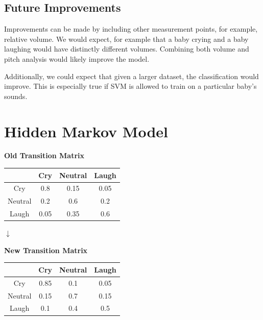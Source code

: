 \documentclass[paper=a4, fontsize=11pt]{scrartcl}
\numberwithin{equation}{section}
\numberwithin{figure}{section}
\numberwithin{table}{section}
\begin{document}
\subsection{Future Improvements}
Improvements can be made by including other measurement points, for example, relative volume. We would expect, for example that a baby crying and a baby laughing would have distinctly different volumes. Combining both volume and pitch analysis would likely improve the model.

Additionally, we could expect that given a larger dataset, the classification would improve. This is especially true if SVM is allowed to train on a particular baby's sounds.

\section{Hidden Markov Model} 

\begin{center}
\textbf{Old Transition Matrix}

\begin{tabular}{ |c|c|c|c| } 
 \hline
       & Cry & Neutral & Laugh \\
 \hline
 Cry & 0.8 & 0.15 & 0.05 \\ 
 Neutral & 0.2 & 0.6 & 0.2 \\ 
 Laugh & 0.05 & 0.35 & 0.6 \\
 \hline
\end{tabular}

\begin{huge}$\downarrow$\end{huge}

\textbf{New Transition Matrix}

\begin{tabular}{ |c|c|c|c| } 
 \hline
       & Cry & Neutral & Laugh \\
 \hline
 Cry & 0.85 & 0.1 & 0.05 \\ 
 Neutral & 0.15 & 0.7 & 0.15 \\ 
 Laugh & 0.1 & 0.4 & 0.5 \\
 \hline
\end{tabular}
\end{center}

\end{document}
